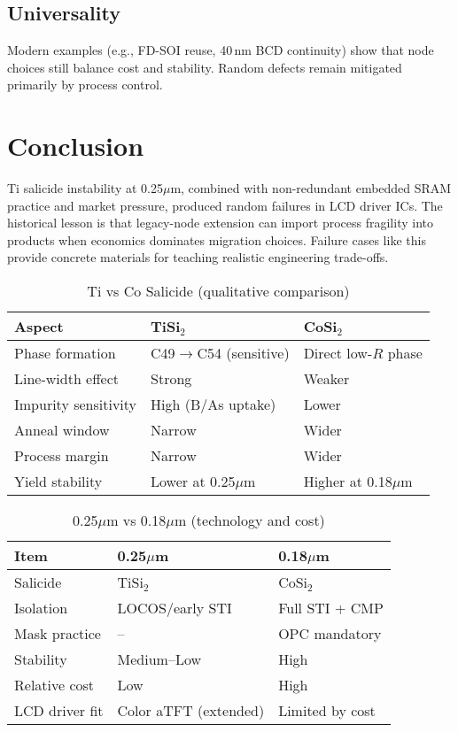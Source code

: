 \documentclass[conference]{IEEEtran}
\begin{document}
\subsection{Universality}
Modern examples (e.g., FD-SOI reuse, 40\,nm BCD continuity) show that node choices still balance cost and stability. Random defects remain mitigated primarily by process control.

\section{Conclusion}
Ti salicide instability at 0.25$\mu$m, combined with non-redundant embedded SRAM practice and market pressure, produced random failures in LCD driver ICs. The historical lesson is that legacy-node extension can import process fragility into products when economics dominates migration choices. Failure cases like this provide concrete materials for teaching realistic engineering trade-offs.

\begin{table}[t]
\caption{Ti vs Co Salicide (qualitative comparison)}
\label{tab:salicide}
\centering
\begin{tabular}{@{}lll@{}}
\toprule
Aspect & TiSi$_2$ & CoSi$_2$ \\
\midrule
Phase formation & C49$\rightarrow$C54 (sensitive) & Direct low-$R$ phase \\
Line-width effect & Strong & Weaker \\
Impurity sensitivity & High (B/As uptake) & Lower \\
Anneal window & Narrow & Wider \\
Process margin & Narrow & Wider \\
Yield stability & Lower at 0.25$\mu$m & Higher at 0.18$\mu$m \\
\bottomrule
\end{tabular}
\end{table}

\begin{table}[t]
\caption{0.25$\mu$m vs 0.18$\mu$m (technology and cost)}
\label{tab:025vs018}
\centering
\begin{tabular}{@{}lll@{}}
\toprule
Item & 0.25$\mu$m & 0.18$\mu$m \\
\midrule
Salicide & TiSi$_2$ & CoSi$_2$ \\
Isolation & LOCOS/early STI & Full STI + CMP \\
Mask practice & -- & OPC mandatory \\
Stability & Medium--Low & High \\
Relative cost & Low & High \\
LCD driver fit & Color aTFT (extended) & Limited by cost \\
\bottomrule
\end{tabular}
\end{table}
\end{document}

